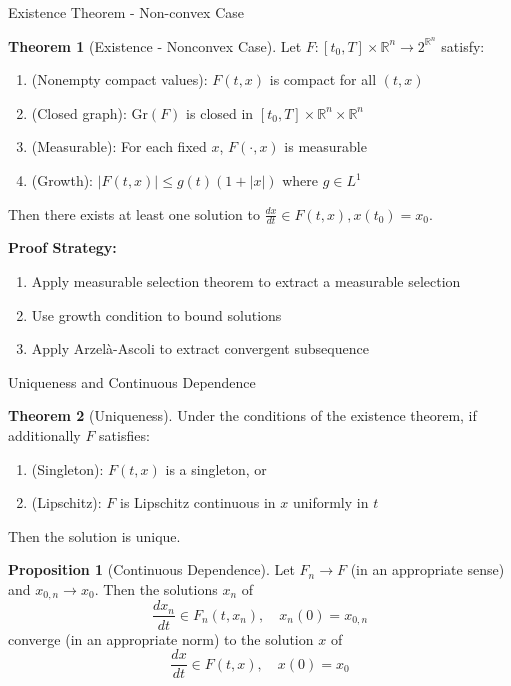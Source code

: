 \documentclass[aspectratio=169,10pt]{beamer}
\theoremstyle{definition}
\newtheorem{thm}{Theorem}[section]
\newtheorem{prop}{Proposition}[section]
\begin{document}
\begin{frame}{Existence Theorem - Non-convex Case}

\begin{thm}[Existence - Nonconvex Case]
Let $F: [t_0, T] \times \mathbb{R}^n \to 2^{\mathbb{R}^n}$ satisfy:
\begin{enumerate}
    \item (Nonempty compact values): $F(t, x)$ is compact for all $(t, x)$

    \item (Closed graph): $\text{Gr}(F)$ is closed in $[t_0, T] \times \mathbb{R}^n \times \mathbb{R}^n$

    \item (Measurable): For each fixed $x$, $F(\cdot, x)$ is measurable

    \item (Growth): $|F(t, x)| \leq g(t) (1 + |x|)$ where $g \in L^1$
\end{enumerate}

Then there exists at least one solution to $\frac{dx}{dt} \in F(t, x), x(t_0) = x_0$.
\end{thm}

\vspace{0.3cm}

\textbf{Proof Strategy:}
\begin{enumerate}
    \item Apply measurable selection theorem to extract a measurable selection
    \item Use growth condition to bound solutions
    \item Apply Arzelà-Ascoli to extract convergent subsequence
\end{enumerate}

\end{frame}

\begin{frame}{Uniqueness and Continuous Dependence}

\begin{thm}[Uniqueness]
Under the conditions of the existence theorem, if additionally $F$ satisfies:
\begin{enumerate}
    \item (Singleton): $F(t, x)$ is a singleton, or
    \item (Lipschitz): $F$ is Lipschitz continuous in $x$ uniformly in $t$
\end{enumerate}
Then the solution is unique.
\end{thm}

\vspace{0.3cm}

\begin{prop}[Continuous Dependence]
Let $F_n \to F$ (in an appropriate sense) and $x_{0,n} \to x_0$. Then the solutions $x_n$ of
\[
\frac{dx_n}{dt} \in F_n(t, x_n), \quad x_n(0) = x_{0,n}
\]
converge (in an appropriate norm) to the solution $x$ of
\[
\frac{dx}{dt} \in F(t, x), \quad x(0) = x_0
\]
\end{prop}

\end{frame}
\end{document}
